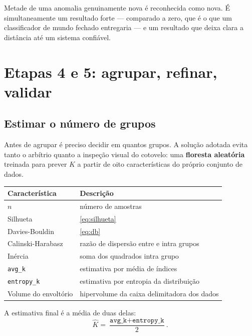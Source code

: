 Metade de uma anomalia genuinamente nova é reconhecida como nova. É simultaneamente um
resultado forte --- comparado a zero, que é o que um classificador de mundo fechado
entregaria --- e um resultado que deixa clara a distância até um sistema confiável.

\section{Etapas 4 e 5: agrupar, refinar, validar}

\subsection{Estimar o número de grupos}

Antes de agrupar é preciso decidir em quantos grupos. A solução adotada evita tanto o
arbítrio quanto a inspeção visual do cotovelo: uma \textbf{floresta aleatória} treinada
para prever $K$ a partir de oito características do próprio conjunto de dados.

\begin{center}
\small
\begin{tabular}{ll}
\toprule
\textbf{Característica} & \textbf{Descrição} \\
\midrule
$n$                    & número de amostras \\
Silhueta               & \cref{eq:silhueta} \\
Davies-Bouldin         & \cref{eq:db} \\
Calinski-Harabasz      & razão de dispersão entre e intra grupos \\
Inércia                & soma dos quadrados intra grupo \\
\texttt{avg\_k}        & estimativa por média de índices \\
\texttt{entropy\_k}    & estimativa por entropia da distribuição \\
Volume do envoltório   & hipervolume da caixa delimitadora dos dados \\
\bottomrule
\end{tabular}
\end{center}

A estimativa final é a média de duas delas:
\begin{equation}
  \hat{K} = \frac{\texttt{avg\_k} + \texttt{entropy\_k}}{2}.
  \label{eq:aberto-k}
\end{equation}

